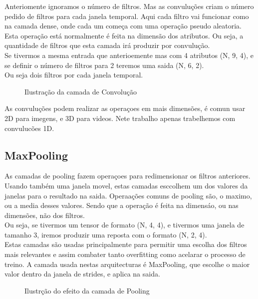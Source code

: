 Anteriomente ignoramos o número de filtros. Mas as convuluções criam o número pedido de filtros para cada janela temporal. Aqui cada filtro vai funcionar como na camada dense, onde cada um começa com uma operação pseudo aleatoria. Esta operação está normalmente é feita na dimensão dos atributos. Ou seja, a quantidade de filtros que esta camada irá produzir por convulução. \\
Se tivermos a mesma entrada que anterioemente mas com 4 atributos (N, 9, 4), e se definir o número de filtros para 2 teremos uma saida (N, 6, 2). \\
Ou seja dois filtros por cada janela temporal. 


\begin{figure}[H]
	\centering
	\resizebox{\linewidth}{!}{}
	\caption{Ilustração da camada de Convolução}
	\label{fig:conv_layer}
\end{figure}

As convuluções podem realizar as operaçoes em mais dimensões, é comun usar 2D para imegens, e 3D para videos. Nete trabalho apenas trabelhemos com convulucões 1D.\\


\subsection{MaxPooling\label{se:max_pooling}}

As camadas de pooling fazem operaçoes para redimensionar os filtros anteriores. \\
Usando também uma janela movel, estas camadas esccolhem um dos valores da janelas para o resultado na saida. Operaações comuns de pooling são, o maximo, ou a media desses valores. Sendo que a operação é feita na dimensáo, ou nas dimensões, não dos filtros. \\
Ou seja, se tivermos um tensor de formato (N, 4, 4), e tivermos uma janela de tamanho 3, iremos produzir uma reposta com o formato (N, 2, 4).\\
Estas camadas são usadas principalmente para permitir uma escolha dos filtros mais relevantes e assim combater tanto overfitting como acelarar o processo de treino. \cite{Matoba2022}
A camada usada nestas arquitecturas é MaxPooling, que escolhe o maior valor dentro da janela de strides, e aplica na saida. \\

\begin{figure}[H]
	\centering
	\resizebox{\linewidth}{!}{}
	\caption{Ilustrção do efeito da camada de Pooling}
	\label{fig:pooling}
\end{figure}



